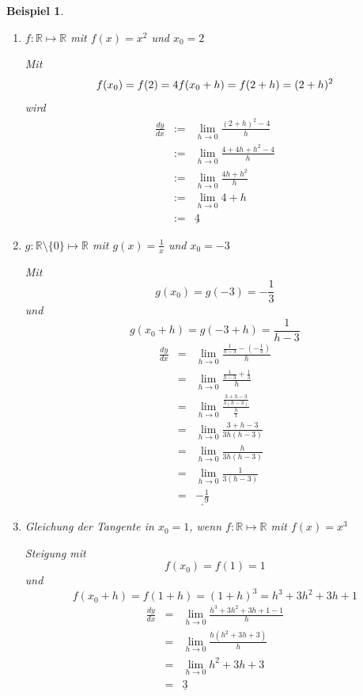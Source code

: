 \documentclass{report}
\newtheorem{myexample}{Beispiel}
\begin{document}
\begin{myexample}\begin{enumerate}
\item $ f:\mathbb{R} \mapsto \mathbb{R}$ mit $f(x) = x^2$ und $x_0 = 2$

Mit \begin{equation} f(x_0) = f(2) = 4 \\ f(x_0 + h) = f(2 + h) = (2+h)^2 \end{equation}
wird \begin{eqnarray} \frac{dy}{dx} & := & \lim_{h \to 0} \frac{(2+h)^2 - 4}{h} \\
 & := & \lim_{h \to 0}  \frac{4 + 4h + h^2 - 4}{h} \\
 & := & \lim_{h \to 0}  \frac{4h + h^2}{h} \\
 & := & \lim_{h \to 0} 4 + h \\
 & := & \underline{4} \end{eqnarray}
\item $ g:\mathbb{R} \setminus \{0\} \mapsto \mathbb{R}$ mit $g(x) = \frac{1}{x}$ und $x_0 = -3$

Mit \begin{equation} g(x_0) = g(-3) = -\frac{1}{3} \end{equation}
und \begin{equation} g(x_0 + h) = g(-3 + h) = \frac{1}{h-3} \end{equation}
\begin{eqnarray}
 \frac{dy}{dx} & = & \lim_{h \to 0} \frac{\frac{1}{h-3} - (-\frac{1}{3})}{h} \\
 & = & \lim_{h \to 0} \frac{\frac{1}{h-3} +\frac{1}{3}}{h} \\
 & = & \lim_{h \to 0}  \frac{\frac{3 + h-3}{3(h-3)}}{\frac{h}{1}} \\
 & = & \lim_{h \to 0} \frac{3+h-3}{3h(h-3)} \\
 & = & \lim_{h \to 0} \frac{h}{3h(h-3)} \\
 & = & \lim_{h \to 0} \frac{1}{3(h-3)} \\
 & = & \underline{-\frac{1}{9}} \end{eqnarray}
\item Gleichung der Tangente in $x_0 = 1$, wenn $ f:\mathbb{R} \mapsto \mathbb{R}$ mit $ f(x) = x^3$

Steigung mit \begin{equation} f(x_0) = f(1) = 1 \end{equation}
und \begin{equation} f(x_0 + h) = f(1 + h) = (1 + h)^3 = h^3 + 3h^2 + 3h + 1\end{equation}
\begin{eqnarray}
 \frac{dy}{dx} & = & \lim_{h \to 0} \frac{h^3 + 3h^2 + 3h + 1 - 1}{h} \\
 & = & \lim_{h \to 0} \frac{h(h^2 + 3h + 3)}{h} \\
 & = & \lim_{h \to 0} h^2 + 3h + 3 \\
 & = & \underline{3} \end{eqnarray}
\end{enumerate}\end{myexample}
\end{document}
